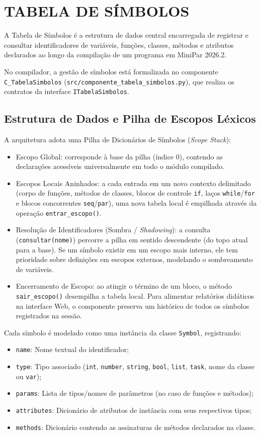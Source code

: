 \chapter{TABELA DE SÍMBOLOS}

A Tabela de Símbolos é a estrutura de dados central encarregada de registrar e consultar identificadores de variáveis, funções, classes, métodos e atributos declarados ao longo da compilação de um programa em MiniPar 2026.2. 

No compilador, a gestão de símbolos está formalizada no componente \texttt{C\_TabelaSimbolos} (\texttt{src/componente\_tabela\_simbolos.py}), que realiza os contratos da interface \texttt{ITabelaSimbolos}.

\section{Estrutura de Dados e Pilha de Escopos Léxicos}

A arquitetura adota uma Pilha de Dicionários de Símbolos (\textit{Scope Stack}):
\begin{itemize}
    \item Escopo Global: corresponde à base da pilha (índice 0), contendo as declarações acessíveis universalmente em todo o módulo compilado.
    \item Escopos Locais Aninhados: a cada entrada em um novo contexto delimitado (corpo de funções, métodos de classes, blocos de controle \texttt{if}, laços \texttt{while}/\texttt{for} e blocos concorrentes \texttt{seq}/\texttt{par}), uma nova tabela local é empilhada através da operação \texttt{entrar\_escopo()}.
    \item Resolução de Identificadores (Sombra / \textit{Shadowing}): a consulta (\texttt{consultar(nome)}) percorre a pilha em sentido descendente (do topo atual para a base). Se um símbolo existir em um escopo mais interno, ele tem prioridade sobre definições em escopos externos, modelando o sombreamento de variáveis.
    \item Encerramento de Escopo: ao atingir o término de um bloco, o método \texttt{sair\_escopo()} desempilha a tabela local. Para alimentar relatórios didáticos na interface Web, o componente preserva um histórico de todos os símbolos registrados na sessão.
\end{itemize}

Cada símbolo é modelado como uma instância da classe \texttt{Symbol}, registrando:
\begin{itemize}
    \item \texttt{name}: Nome textual do identificador;
    \item \texttt{type}: Tipo associado (\texttt{int}, \texttt{number}, \texttt{string}, \texttt{bool}, \texttt{list}, \texttt{task}, nome da classe ou \texttt{var});
    \item \texttt{params}: Lista de tipos/nomes de parâmetros (no caso de funções e métodos);
    \item \texttt{attributes}: Dicionário de atributos de instância com seus respectivos tipos;
    \item \texttt{methods}: Dicionário contendo as assinaturas de métodos declarados na classe.
\end{itemize}

